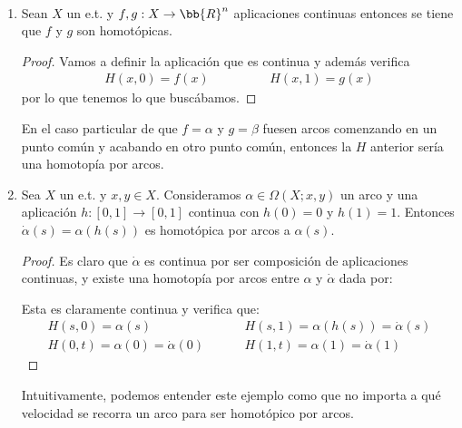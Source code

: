 \begin{ejemplo}\
    \begin{enumerate}
        \item Sean $X$ un e.t. y $f,g:X \to \bb{R}^n$ aplicaciones continuas entonces se tiene que $f$ y $g$ son homotópicas.
        \begin{proof}
            Vamos a definir la aplicación
            que es continua y además verifica
            \begin{gather*}
                H(x,0) = f(x) \hspace{2cm} H(x,1) = g(x)
            \end{gather*}
            por lo que tenemos lo que buscábamos.
        \end{proof}
        En el caso particular de que $f=\alpha$ y $g=\beta$ fuesen arcos comenzando en un punto común y acabando en otro punto común, entonces la $H$ anterior sería una homotopía por arcos.

        \item Sea $X$ un e.t. y $x,y\in X$. Consideramos $\alpha\in \Omega(X; x,y)$ un arco y una aplicación $h:[0,1] \to [0,1]$ continua con $h(0)=0$ y $h(1)=1$. Entonces $\dot{\alpha}(s) = \alpha(h(s))$ es homotópica por arcos a $\alpha(s)$.
        
        \begin{proof}
            Es claro que $\dot{\alpha}$ es continua por ser composición de aplicaciones continuas, y existe una homotopía por arcos entre $\alpha$ y $\dot{\alpha}$ dada por:
            \Func{H}{[0,1]\times [0,1]}{X}{(s,t)}{\alpha((1-t)s + th(s))}

            Esta es claramente continua y verifica que:
            \begin{align*}
                H(s,0) = \alpha(s) \hspace{1cm} & H(s,1) = \alpha(h(s)) = \dot{\alpha}(s)\\
                H(0,t) = \alpha(0)=\dot{\alpha}(0) \hspace{1cm} & H(1,t) = \alpha(1) = \dot{\alpha}(1)
            \end{align*}
        \end{proof}
        Intuitivamente, podemos entender este ejemplo como que no importa a qué velocidad se recorra un arco para ser homotópico por arcos.\label{ej:homotopia_velocidad}
    \end{enumerate} 
\end{ejemplo}

